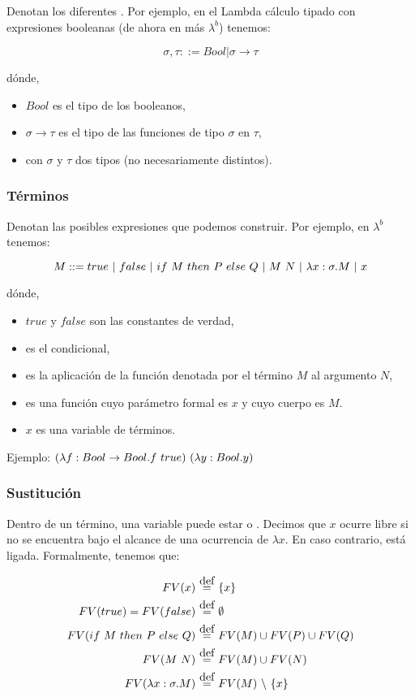 Denotan los diferentes . Por ejemplo, en el Lambda cálculo tipado con expresiones booleanas (de ahora en más $\lambda^b$) tenemos:

\[ \sigma, \tau ::= Bool|\sigma\to\tau \]

dónde,
\begin{itemize}
  \item $Bool$ es el tipo de los booleanos,
  \item $\sigma\to\tau$ es el tipo de las funciones de tipo $\sigma$ en $\tau$,
  \item con $\sigma$ y $\tau$ dos tipos (no necesariamente distintos).
\end{itemize}

\subsubsection{Términos}

Denotan las posibles expresiones que podemos construir. Por ejemplo, en $\lambda^b$ tenemos:

\[ M ::= true \ |\  false \ |\  if\ M\ then\ P\ else\ Q \ |\  M\ N \ |\  \lambda x:\sigma.M \ |\  x \]

dónde,
\begin{itemize}
  \item $true$ y $false$ son las constantes de verdad,
  \item {} es el condicional,
  \item {} es la aplicación de la función denotada por el término $M$ al argumento $N$,
  \item {} es una función cuyo parámetro formal es $x$ y cuyo cuerpo es $M$.
  \item $x$ es una variable de términos.
\end{itemize}

Ejemplo: $\app{(\abs{f}{Bool \to Bool}{f\ true})}{(\abs{y}{Bool}{y})}$

\subsubsection{Sustitución}

Dentro de un término, una variable puede estar  o . Decimos que $x$ ocurre libre si no se encuentra bajo el alcance de una ocurrencia de $\lambda x$. En caso contrario, está ligada. Formalmente, tenemos que:

\begin{align*}
FV(x) &\eqdef \{x\} \\
FV(true) = FV (false) &\eqdef \emptyset \\
FV(\ifte{M}{P}{Q}) &\eqdef FV(M) \cup FV(P) \cup FV(Q) \\
FV(\app{M}{N}) &\eqdef FV(M) \cup FV(N) \\
FV(\abs{x}{\sigma}{M}) &\eqdef FV(M)\ \backslash\ \{x\} \\
\end{align*}

